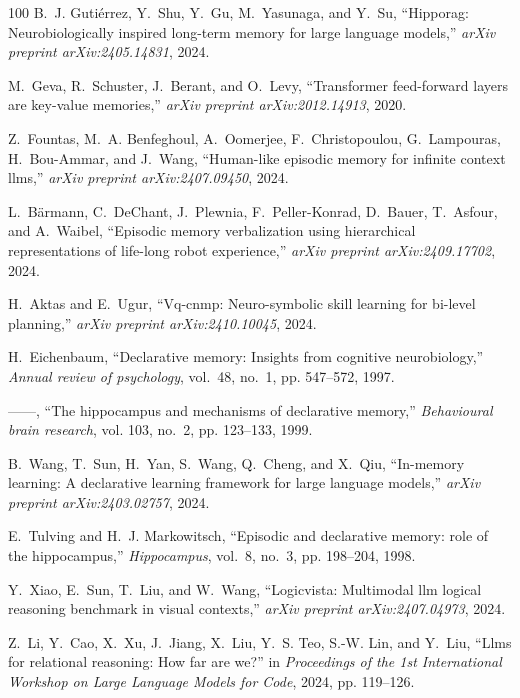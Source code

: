 \documentclass[10pt,journal,compsoc]{IEEEtran}
\begin{document}
\begin{thebibliography}{100}
	B.~J. Guti{\'e}rrez, Y.~Shu, Y.~Gu, M.~Yasunaga, and Y.~Su, ``Hipporag:
	Neurobiologically inspired long-term memory for large language models,''
	\emph{arXiv preprint arXiv:2405.14831}, 2024.
	
	M.~Geva, R.~Schuster, J.~Berant, and O.~Levy, ``Transformer feed-forward layers
	are key-value memories,'' \emph{arXiv preprint arXiv:2012.14913}, 2020.
	
	Z.~Fountas, M.~A. Benfeghoul, A.~Oomerjee, F.~Christopoulou, G.~Lampouras,
	H.~Bou-Ammar, and J.~Wang, ``Human-like episodic memory for infinite context
	llms,'' \emph{arXiv preprint arXiv:2407.09450}, 2024.
	
	L.~B{\"a}rmann, C.~DeChant, J.~Plewnia, F.~Peller-Konrad, D.~Bauer, T.~Asfour,
	and A.~Waibel, ``Episodic memory verbalization using hierarchical
	representations of life-long robot experience,'' \emph{arXiv preprint
		arXiv:2409.17702}, 2024.
	
	H.~Aktas and E.~Ugur, ``Vq-cnmp: Neuro-symbolic skill learning for bi-level
	planning,'' \emph{arXiv preprint arXiv:2410.10045}, 2024.
	
	H.~Eichenbaum, ``Declarative memory: Insights from cognitive neurobiology,''
	\emph{Annual review of psychology}, vol.~48, no.~1, pp. 547--572, 1997.
	
	------, ``The hippocampus and mechanisms of declarative memory,''
	\emph{Behavioural brain research}, vol. 103, no.~2, pp. 123--133, 1999.
	
	B.~Wang, T.~Sun, H.~Yan, S.~Wang, Q.~Cheng, and X.~Qiu, ``In-memory learning: A
	declarative learning framework for large language models,'' \emph{arXiv
		preprint arXiv:2403.02757}, 2024.
	
	E.~Tulving and H.~J. Markowitsch, ``Episodic and declarative memory: role of
	the hippocampus,'' \emph{Hippocampus}, vol.~8, no.~3, pp. 198--204, 1998.
	
	Y.~Xiao, E.~Sun, T.~Liu, and W.~Wang, ``Logicvista: Multimodal llm logical
	reasoning benchmark in visual contexts,'' \emph{arXiv preprint
		arXiv:2407.04973}, 2024.
	
	Z.~Li, Y.~Cao, X.~Xu, J.~Jiang, X.~Liu, Y.~S. Teo, S.-W. Lin, and Y.~Liu,
	``Llms for relational reasoning: How far are we?'' in \emph{Proceedings of
		the 1st International Workshop on Large Language Models for Code}, 2024, pp.
	119--126.
	

\end{thebibliography}
\end{document}
